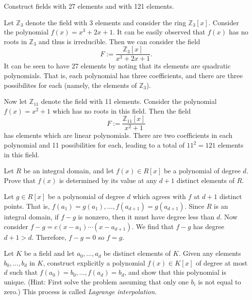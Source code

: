 \documentclass[../../master.tex]{subfiles}
\begin{document}
\begin{problem}
    Construct fields with 27 elements and with 121 elements.
\end{problem}

\begin{solution}
    Let $\mathbb{Z}_3$ denote the field with 3 elements and consider the ring $\mathbb{Z}_3[x]$.
    Consider the polynomial $f(x) = x^3 + 2x + 1$.
    It can be easily observed that $f(x)$ has no roots in $\mathbb{Z}_3$ and thus is irreducible.
    Then we can consider the field
    \[
        F := \frac{\mathbb{Z}_3[x]}{x^3 + 2x + 1}.
    \]
    It can be seen to have 27 elements by noting that its elements are quadratic polynomials.
    That is, each polynomial has three coefficients, and there are three possibilites for each (namely, the elements of $\mathbb{Z}_3$).

    Now let $\mathbb{Z}_11$ denote the field with 11 elements.
    Consider the polynomial $f(x) = x^2 + 1$ which has no roots in this field.
    Then the field
    \[
        F := \frac{\mathbb{Z}_{11}[x]}{x^2 + 1}
    \]
    has elements which are linear polynomials. 
    There are two coefficients in each polynomial and 11 possibilities for each, leading to a total of $11^2 = 121$ elements in this field.
\end{solution}

\begin{problem}
    Let $R$ be an integral domain, and let $f(x) \in R[x]$ be a polynomial of degree $d$.
    Prove that $f(x)$ is determined by its value at any $d + 1$ distinct elements of $R$.
\end{problem}

\begin{solution}
    Let $g \in R[x]$ be a polynomial of degree $d$ which agrees with $f$ at $d + 1$ distinct points.
    That is, $f(a_1) = g(a_1), \ldots, f(a_{d+1}) = g(a_{d+1})$.
    Since $R$ is an integral domain, if $f - g$ is nonzero, then it must have degree less than $d$.
    Now consider $f - g = c(x - a_1) \cdots (x - a_{d+1})$.
    We find that $f - g$ has degree $d + 1 > d$.
    Therefore, $f - g = 0$ so $f = g$.
\end{solution}

\begin{problem}
    Let $K$ be a field and let $a_0, \ldots, a_d$ be distinct elements of $K$.
    Given any elements $b_0, \ldots, b_d$ in $K$, construct explicitly a polynomial $f(x) \in K[x]$ of degree at most $d$ such that $f(a_0) = b_0, \ldots, f(a_d) = b_d$, and show that this polynomial is unique.
    (Hint: First solve the problem assuming that only one $b_i$ is not equal to zero.)
    This process is called \textit{Lagrange interpolation}.
\end{problem}
\end{document}
